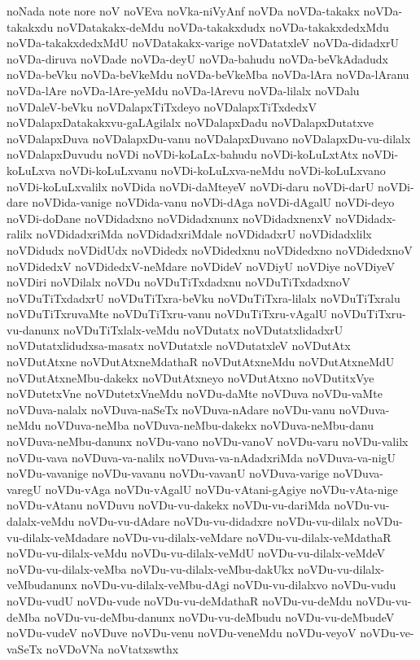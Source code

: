 {noNada
note
nore
noV
noVEva
noVka-niVyAnf
noVDa
noVDa-takakx
noVDa-takakxdu
noVDatakakx-deMdu
noVDa-takakxdudx
noVDa-takakxdedxMdu
noVDa-takakxdedxMdU
noVDatakakx-varige
noVDatatxleV
noVDa-didadxrU
noVDa-diruva
noVDade
noVDa-deyU
noVDa-bahudu
noVDa-beVkAdadudx
noVDa-beVku
noVDa-beVkeMdu
noVDa-beVkeMba
noVDa-lAra
noVDa-lAranu
noVDa-lAre
noVDa-lAre-yeMdu
noVDa-lArevu
noVDa-lilalx
noVDalu
noVDaleV-beVku
noVDalapxTiTxdeyo
noVDalapxTiTxdedxV
noVDalapxDatakakxvu-gaLAgilalx
noVDalapxDadu
noVDalapxDutatxve
noVDalapxDuva
noVDalapxDu-vanu
noVDalapxDuvano
noVDalapxDu-vu-dilalx
noVDalapxDuvudu
noVDi
noVDi-koLaLx-bahudu
noVDi-koLuLxtAtx
noVDi-koLuLxva
noVDi-koLuLxvanu
noVDi-koLuLxva-neMdu
noVDi-koLuLxvano
noVDi-koLuLxvalilx
noVDida
noVDi-daMteyeV
noVDi-daru
noVDi-darU
noVDi-dare
noVDida-vanige
noVDida-vanu
noVDi-dAga
noVDi-dAgalU
noVDi-deyo
noVDi-doDane
noVDidadxno
noVDidadxnunx
noVDidadxnenxV
noVDidadx-ralilx
noVDidadxriMda
noVDidadxriMdale
noVDidadxrU
noVDidadxlilx
noVDidudx
noVDidUdx
noVDidedx
noVDidedxnu
noVDidedxno
noVDidedxnoV
noVDidedxV
noVDidedxV-neMdare
noVDideV
noVDiyU
noVDiye
noVDiyeV
noVDiri
noVDilalx
noVDu
noVDuTiTxdadxnu
noVDuTiTxdadxnoV
noVDuTiTxdadxrU
noVDuTiTxra-beVku
noVDuTiTxra-lilalx
noVDuTiTxralu
noVDuTiTxruvaMte
noVDuTiTxru-vanu
noVDuTiTxru-vAgalU
noVDuTiTxru-vu-danunx
noVDuTiTxlalx-veMdu
noVDutatx
noVDutatxlidadxrU
noVDutatxlidudxsa-masatx
noVDutatxle
noVDutatxleV
noVDutAtx
noVDutAtxne
noVDutAtxneMdathaR
noVDutAtxneMdu
noVDutAtxneMdU
noVDutAtxneMbu-dakekx
noVDutAtxneyo
noVDutAtxno
noVDutitxVye
noVDutetxVne
noVDutetxVneMdu
noVDu-daMte
noVDuva
noVDu-vaMte
noVDuva-nalalx
noVDuva-naSeTx
noVDuva-nAdare
noVDu-vanu
noVDuva-neMdu
noVDuva-neMba
noVDuva-neMbu-dakekx
noVDuva-neMbu-danu
noVDuva-neMbu-danunx
noVDu-vano
noVDu-vanoV
noVDu-varu
noVDu-valilx
noVDu-vava
noVDuva-va-nalilx
noVDuva-va-nAdadxriMda
noVDuva-va-nigU
noVDu-vavanige
noVDu-vavanu
noVDu-vavanU
noVDuva-varige
noVDuva-varegU
noVDu-vAga
noVDu-vAgalU
noVDu-vAtani-gAgiye
noVDu-vAta-nige
noVDu-vAtanu
noVDuvu
noVDu-vu-dakekx
noVDu-vu-dariMda
noVDu-vu-dalalx-veMdu
noVDu-vu-dAdare
noVDu-vu-didadxre
noVDu-vu-dilalx
noVDu-vu-dilalx-veMdadare
noVDu-vu-dilalx-veMdare
noVDu-vu-dilalx-veMdathaR
noVDu-vu-dilalx-veMdu
noVDu-vu-dilalx-veMdU
noVDu-vu-dilalx-veMdeV
noVDu-vu-dilalx-veMba
noVDu-vu-dilalx-veMbu-dakUkx
noVDu-vu-dilalx-veMbudanunx
noVDu-vu-dilalx-veMbu-dAgi
noVDu-vu-dilalxvo
noVDu-vudu
noVDu-vudU
noVDu-vude
noVDu-vu-deMdathaR
noVDu-vu-deMdu
noVDu-vu-deMba
noVDu-vu-deMbu-danunx
noVDu-vu-deMbudu
noVDu-vu-deMbudeV
noVDu-vudeV
noVDuve
noVDu-venu
noVDu-veneMdu
noVDu-veyoV
noVDu-ve-vaSeTx
noVDoVNa
noVtatxswthx
}
